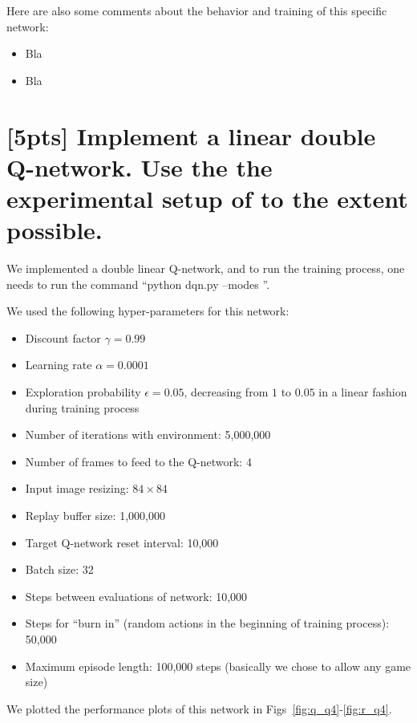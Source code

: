 \documentclass{article}
\begin{document}
Here are also some comments about the behavior and training of this specific network:

\begin{itemize}
  \item Bla
  \item Bla
\end{itemize}

\section{[5pts] Implement a linear double Q-network. Use the the experimental setup of \cite{mnih2013playing,mnih2015human} to the extent possible.}

We implemented a double linear Q-network, and to run the training process, one needs to run the command ``python dqn.py --modes ''.

We used the following hyper-parameters for this network:
\begin{itemize}
  \item Discount factor $\gamma=0.99$
  \item Learning rate $\alpha=0.0001$
  \item Exploration probability $\epsilon=0.05$, decreasing from $1$ to $0.05$ in a linear fashion during training process
  \item Number of iterations with environment: 5,000,000
  \item Number of frames to feed to the Q-network: 4
  \item Input image resizing: $84\times84$
  \item Replay buffer size: 1,000,000
  \item Target Q-network reset interval: 10,000
  \item Batch size: 32
  \item Steps between evaluations of network: 10,000
  \item Steps for ``burn in'' (random actions in the beginning of training process): 50,000
  \item Maximum episode length: 100,000 steps (basically we chose to allow any game size)
\end{itemize}

We plotted the performance plots of this network in Figs~\ref{fig:q_q4}-\ref{fig:r_q4}.

\end{document}
